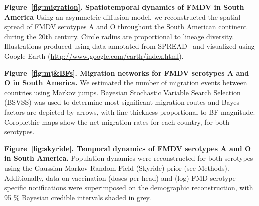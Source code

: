 \documentclass[10pt]{article}
\begin{document}
{\bf Figure~\ref{fig:migration}. Spatiotemporal dynamics of FMDV in South America} Using an asymmetric diffusion model, we reconstructed the spatial spread of FMDV serotypes A and O throughout the South American continent during the 20th century.
Circle radius are proportional to lineage diversity.
Illustrations produced using data annotated from SPREAD~\cite{spread} and visualized using Google Earth (\url{http://www.google.com/earth/index.html}).

{\bf Figure~\ref{fig:mj&BFs}. Migration networks for FMDV serotypes A and O in South America.} We estimated the number of migration events between countries using Markov jumps.
Bayesian Stochastic Variable Search Selection (BSVSS) was used to determine most significant migration routes and Bayes factors are depicted by arrows, with line thickness proportional to BF magnitude.
Coroplethic maps show the net migration rates for each country, for both serotypes.

{\bf Figure~\ref{fig:skyride}. Temporal dynamics of FMDV serotypes A and O in South America.} Population dynamics were reconstructed for both serotypes using the Gaussian Markov Random Field (Skyride) prior (see Methods).
Additionally, data on vaccination  (doses per head) and (log) FMD serotype-specific notifications were superimposed on the demographic reconstruction, with 95 \% Bayesian credible intervals shaded in grey.

\newpage
\end{document}

